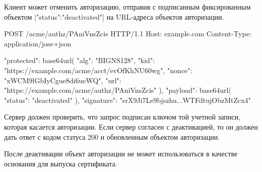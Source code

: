 Клиент может отменить авторизацию, отправив 
 с подписанным фиксированным объектом 
\code|{"status":"deactivated"}| на URL-адреса объектов авторизации. 

\begin{codeblock}
POST /acme/authz/PAniVnsZcis HTTP/1.1
Host: example.com
Content-Type: application/jose+json

{
  "protected": base64url({
    "alg": "BIGNS128",
    "kid": "https://example.com/acme/acct/evOfKhNU60wg",
    "nonce": "xWCM9lGbIyCgue8di6ueWQ",
    "url": "https://example.com/acme/authz/PAniVnsZcis"
  }),
  "payload": base64url({
    "status": "deactivated"
  }),
  "signature": "srX9Ji7Le9bjszhu...WTFdtujObzMtZcx4"
}
\end{codeblock}
\fi

Сервер должен проверить, что запрос подписан ключом той учетной записи, 
которая касается авторизации. Если сервер согласен с деактивацией, 
то он должен дать ответ с кодом статуса 200 и обновленным объектом авторизации.

После деактивации объект авторизации не может использоваться в качестве 
основания для выпуска сертификата.
